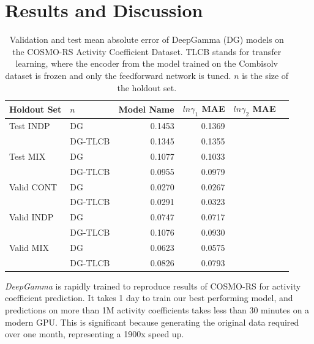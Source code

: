 \section{Results and Discussion}

\begin{table}
    \centering
    \caption{Validation and test mean absolute error of DeepGamma (DG) models on the COSMO-RS Activity  Coefficient Dataset. TLCB stands for transfer learning, where the encoder from the model trained on the Combisolv dataset is frozen and only the feedforward network is tuned. $n$ is the size of the holdout set.}
    \label{tab:cosmo_rs_results}
    \begin{tabular}{llrrrr}
    \toprule
    Holdout Set & $n$ & Model Name &  $ln\gamma_1$ MAE &   $ln\gamma_2$ MAE \\
    \midrule
    Test INDP & DG & 0.1453 & 0.1369 \\
              & DG-TLCB & 0.1345 & 0.1355 \\
    Test MIX & DG & 0.1077 & 0.1033 \\
              & DG-TLCB & 0.0955 & 0.0979 \\
    Valid CONT & DG & 0.0270 & 0.0267 \\
              & DG-TLCB & 0.0291 & 0.0323 \\
    Valid INDP & DG & 0.0747 & 0.0717 \\
              & DG-TLCB & 0.1076 & 0.0930 \\
    Valid MIX & DG & 0.0623 & 0.0575 \\
              & DG-TLCB & 0.0826 & 0.0793 \\
    \bottomrule
    \end{tabular}
\end{table}


\textit{DeepGamma} is rapidly trained to reproduce results of COSMO-RS for activity coefficient prediction. It takes 1 day to train our best performing model, and predictions on more than 1M activity coefficients takes less than 30 minutes on a modern GPU. This is significant because generating the original data required over one month, representing a 1900x speed up.


